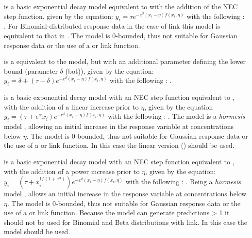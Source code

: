 \documentclass[
  shortnames]{jss}
\begin{document}
 is a basic exponential decay model equivalent to  with the addition of the NEC step function, given by the equation:
\(y_i = \tau e^{-e^{\beta} \left(x_i - \eta \right) f(x_i, \eta)}\)
with the following : . For Binomial-distributed response data in the case of  link this model is equivalent to that in \citet{Fox2010}. The model is 0-bounded, thus not suitable for Gaussian response data or the use of a  or  link function.

 is a equivalent to the  model, but with an additional parameter defining the lower bound (parameter \(\delta\) (bot)), given by the equation:
\(y_i = \delta + (\tau - \delta) e^{-e^{\beta} \left(x_i - \eta \right) f(x_i, \eta)}\)
with the following : .

 is a basic exponential decay model with an NEC step function equivalent to , with the addition of a linear increase prior to \(\eta\), given by the equation
\(y_i = (\tau + e^{\alpha} x_i) e^{-e^{\beta} \left(x_i - \eta \right) f(x_i, \eta)}\)
with the following : . The  model is a \emph{hormesis} model \citep{Mattson2008}, allowing an initial increase in the response variable at concentrations below \(\eta\). The model is 0-bounded, thus not suitable for Gaussian response data or the use of a  or  link function. In this case the linear version () should be used.

 is a basic exponential decay model with an NEC step function equivalent to , with the addition of a power increase prior to \(\eta\), given by the equation:
\(y_i = (\tau + x_i^{1/(1+e^{\alpha})}) e^{-e^{\beta} \left(x_i - \eta \right) f(x_i, \eta)}\)
with the following : . Being a \emph{hormesis} model \citep{Mattson2008},  allows an initial increase in the response variable at concentrations below \(\eta\). The model is 0-bounded, thus not suitable for Gaussian response data or the use of a  or  link function. Because the model can generate predictions \textgreater{} 1 it should not be used for Binomial and Beta distributions with  link. In this case the  model should be used.
\end{document}
